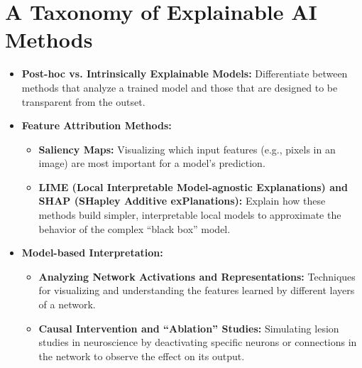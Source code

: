 \documentclass[11pt,a4paper]{article}
\begin{document}
\section{A Taxonomy of Explainable AI Methods}
\begin{itemize}
    \item \textbf{Post-hoc vs. Intrinsically Explainable Models:} Differentiate between methods that analyze a trained model and those that are designed to be transparent from the outset.
    \item \textbf{Feature Attribution Methods:}
        \begin{itemize}
            \item \textbf{Saliency Maps:} Visualizing which input features (e.g., pixels in an image) are most important for a model's prediction.
            \item \textbf{LIME (Local Interpretable Model-agnostic Explanations) and SHAP (SHapley Additive exPlanations):} Explain how these methods build simpler, interpretable local models to approximate the behavior of the complex ``black box'' model.
        \end{itemize}
    \item \textbf{Model-based Interpretation:}
        \begin{itemize}
            \item \textbf{Analyzing Network Activations and Representations:} Techniques for visualizing and understanding the features learned by different layers of a network.
            \item \textbf{Causal Intervention and ``Ablation'' Studies:} Simulating lesion studies in neuroscience by deactivating specific neurons or connections in the network to observe the effect on its output.
        \end{itemize}
\end{itemize}
\end{document}
